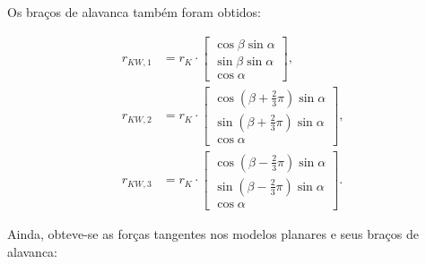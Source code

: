Os braços de alavanca também foram obtidos:

\begin{equation}
    \begin{aligned}
        r_{KW,1} &= r_K \cdot 
        \begin{bmatrix}
        \cos \beta \sin \alpha \\
        \sin \beta \sin \alpha \\
        \cos \alpha
        \end{bmatrix}, \\
        r_{KW,2} &= r_K \cdot 
        \begin{bmatrix}
        \cos \left( \beta + \frac{2}{3}\pi \right) \sin \alpha \\
        \sin \left( \beta + \frac{2}{3}\pi \right) \sin \alpha \\
        \cos \alpha
        \end{bmatrix}, \\
        r_{KW,3} &= r_K \cdot 
        \begin{bmatrix}
        \cos \left( \beta - \frac{2}{3}\pi \right) \sin \alpha \\
        \sin \left( \beta - \frac{2}{3}\pi \right) \sin \alpha \\
        \cos \alpha
        \end{bmatrix}.
    \end{aligned}
\end{equation}

Ainda, obteve-se as forças tangentes nos modelos planares e seus braços de alavanca:

